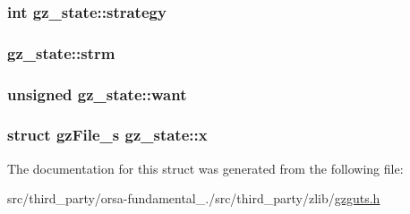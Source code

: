 \subsubsection[{strategy}]{\setlength{\rightskip}{0pt plus 5cm}int gz\+\_\+state\+::strategy}\label{structgz__state_a2777c46311012def486c2aa720fe5203}
\hypertarget{structgz__state_a77df647f4deba86cc8a4fa0a01a08f4e}{}
\subsubsection[{strm}]{ gz\+\_\+state\+::strm}\label{structgz__state_a77df647f4deba86cc8a4fa0a01a08f4e}
\hypertarget{structgz__state_abee992fb115f9f118377b9f46d14b2a5}{}
\subsubsection[{want}]{\setlength{\rightskip}{0pt plus 5cm}unsigned gz\+\_\+state\+::want}\label{structgz__state_abee992fb115f9f118377b9f46d14b2a5}
\hypertarget{structgz__state_a92b9a7b77e0b6a494275d8bf0f0f3274}{}
\subsubsection[{x}]{\setlength{\rightskip}{0pt plus 5cm}struct {\bf gz\+File\+\_\+s} gz\+\_\+state\+::x}\label{structgz__state_a92b9a7b77e0b6a494275d8bf0f0f3274}


The documentation for this struct was generated from the following file\+:\begin{DoxyCompactItemize}
\item 
src/third\+\_\+party/orsa-\/fundamental\+\_./src/third\+\_\+party/zlib/\hyperlink{gzguts_8h}{gzguts.\+h}\end{DoxyCompactItemize}
